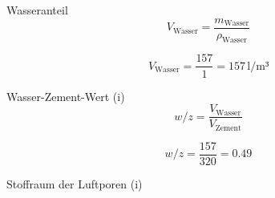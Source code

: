 \begin{frame}{Wasseranteil}
    \begin{equation*}
        V_{\text{Wasser}} = \dfrac{m_{\text{Wasser}}}{\rho_{\text{Wasser}}}
    \end{equation*}

    \pause
    \vspace{0.5cm}
    \begin{equation*}
        V_{\text{Wasser}} = \dfrac{157}{1} = 157 \, \text{l/m³}
    \end{equation*}

\end{frame}

\begin{frame}{Wasser-Zement-Wert (i)}
    \begin{equation*}
        w/z = \dfrac{V_{\text{Wasser}}}{V_{\text{Zement}}}
    \end{equation*}

    \pause
    \vspace{0.5cm}
    \begin{equation*}
        w/z = \dfrac{157}{320} = 0.49
    \end{equation*}

\end{frame}

\begin{frame}{Stoffraum der Luftporen (i)}
    \begin{table}[h]
        \centering
        \caption{Aufgabe zur Stoffraumberechnung}
        \small
    \label{tab:Stoffraumberechnung}
        \end{table}
\end{frame}






